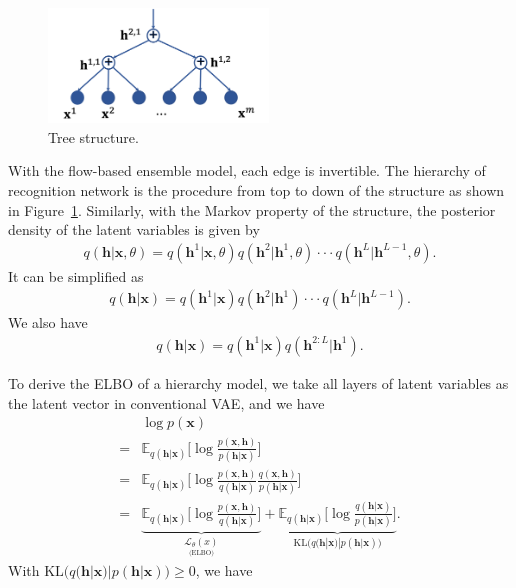\documentclass{article} %
\begin{document}
\begin{figure}[!htbp]
    \centering
    \includegraphics[width=2.3in]{fig/tree_direct.png}
    \caption{Tree structure.}
    \label{fig:tree-d}
\end{figure}

With the flow-based ensemble model, each edge is invertible.   The hierarchy of recognition network is the procedure from top to down of the structure as shown in Figure~\ref{fig:tree-d}.  Similarly, with the Markov property of the structure, the posterior density of the latent 
variables is given by
\begin{align*}
q(\mathbf{h}| \mathbf{x}, \theta ) = q(\mathbf{h}^1 | \mathbf{x}, \theta)  q(\mathbf{h}^2 | \mathbf{h}^1, \theta) \cdot \cdot  \cdot  q(\mathbf{h}^{L} | \mathbf{h}^{L-1}, \theta) .
\end{align*}
It can be simplified as 
\begin{align*}
q(\mathbf{h}| \mathbf{x}) = q(\mathbf{h}^1 | \mathbf{x})  q(\mathbf{h}^2 | \mathbf{h}^1) \cdot \cdot  \cdot  q(\mathbf{h}^{L} | \mathbf{h}^{L-1}) .
\end{align*}
We also have 
\begin{align} \label{eq:chain}
q(\mathbf{h}| \mathbf{x}) = q(\mathbf{h}^1 | \mathbf{x})  q(\mathbf{h}^{2:L} | \mathbf{h}^1) .
\end{align}

To derive the ELBO of a hierarchy model, we take all  layers of latent variables as the latent vector in conventional VAE, and we have 
\begin{align*}
&\log p(\mathbf{x})\\
=&  \mathbb{E}_{q(\mathbf{h} | \mathbf{x})} \bigg[ \log  \frac{p(\mathbf{x}, \mathbf{h})}{p(\mathbf{h}|\mathbf{x})} \bigg] \\
=&  \mathbb{E}_{q(\mathbf{h} | \mathbf{x})} \bigg[ \log  \frac{p(\mathbf{x}, \mathbf{h})}{q(\mathbf{h}|\mathbf{x})}   \frac{q(\mathbf{x}, \mathbf{h})}{p(\mathbf{h}|\mathbf{x})} \bigg] \\
=&  \underbrace{\mathbb{E}_{q(\mathbf{h} | \mathbf{x})} \bigg[ \log  \frac{p(\mathbf{x}, \mathbf{h})}{q(\mathbf{h}|\mathbf{x})}  \bigg]}_{\underset{\text{(ELBO)}}{\mathcal{L}_{\theta}(x)}} +   \underbrace{\mathbb{E}_{q(\mathbf{h} | \mathbf{x})} \bigg[ \log \frac{q(\mathbf{h} |\mathbf{x})}{p(\mathbf{h}|\mathbf{x})} \bigg]}_{\text{KL}\big(q(\mathbf{h} |\mathbf{x}) | p(\mathbf{h}|\mathbf{x})\big)} .
\end{align*}
With $\text{KL}\big(q(\mathbf{h} |\mathbf{x}) | p(\mathbf{h}|\mathbf{x})\big) \geq 0$, we have 
\end{document}
